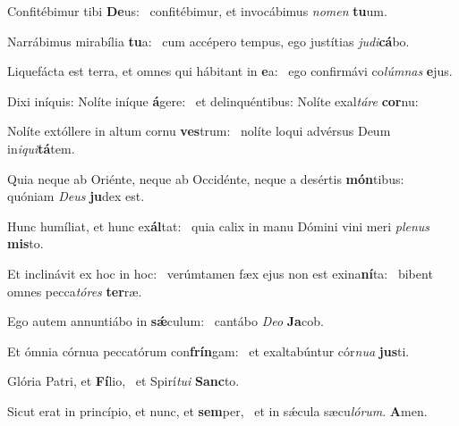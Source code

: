 \item Confitébimur tibi \textbf{De}us:~\psstar{} confitébimur, et invocábimus \textit{nomen} \textbf{tu}um.
\item Narrábimus mirabília \textbf{tu}a:~\psstar{} cum accépero tempus, ego justítias \textit{judi}\textbf{cá}bo.
\item Liquefácta est terra, et omnes qui hábitant in \textbf{e}a:~\psstar{} ego confirmávi co\textit{lúmnas} \textbf{e}jus.
\item Dixi iníquis: Nolíte iníque \textbf{á}gere:~\psstar{} et delinquéntibus: Nolíte exal\textit{táre} \textbf{cor}nu:
\item Nolíte extóllere in altum cornu \textbf{ves}trum:~\psstar{} nolíte loqui advérsus Deum in\textit{iqui}\textbf{tá}tem.
\item Quia neque ab Oriénte, neque ab Occidénte, neque a desértis \textbf{món}tibus:~\psstar{} quóniam \textit{Deus} \textbf{ju}dex est.
\item Hunc humíliat, et hunc ex\textbf{ál}tat:~\psstar{} quia calix in manu Dómini vini meri \textit{plenus} \textbf{mis}to.
\item Et inclinávit ex hoc in hoc:~\pscross{} verúmtamen fæx ejus non est exina\textbf{ní}ta:~\psstar{} bibent omnes pecca\textit{tóres} \textbf{ter}ræ.
\item Ego autem annuntiábo in \textbf{sǽ}culum:~\psstar{} cantábo \textit{Deo} \textbf{Ja}cob.
\item Et ómnia córnua peccatórum con\textbf{frín}gam:~\psstar{} et exaltabúntur cór\textit{nua} \textbf{jus}ti.
\item Glória Patri, et \textbf{Fí}lio,~\psstar{} et Spirí\textit{tui} \textbf{Sanc}to.
\item Sicut erat in princípio, et nunc, et \textbf{sem}per,~\psstar{} et in sǽcula sæcu\textit{lórum}. \textbf{A}men.
